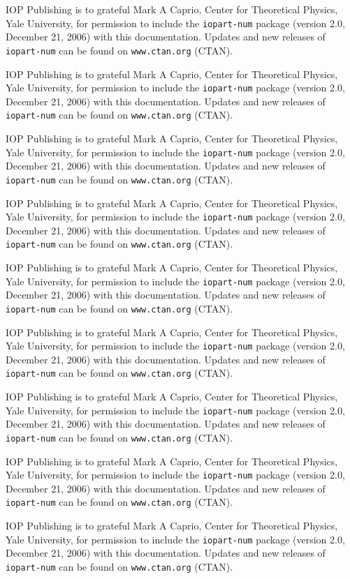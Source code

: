 \documentclass[a4paper]{jpconf}
\begin{document}
\begin{thebibliography}{9}
     IOP Publishing is to grateful Mark A Caprio, Center for Theoretical Physics, Yale University, for permission to include the {\tt iopart-num} \BibTeX package (version 2.0, December 21, 2006) with  this documentation. Updates and new releases of {\tt iopart-num} can be found on \verb"www.ctan.org" (CTAN).

     IOP Publishing is to grateful Mark A Caprio, Center for Theoretical Physics, Yale University, for permission to include the {\tt iopart-num} \BibTeX package (version 2.0, December 21, 2006) with  this documentation. Updates and new releases of {\tt iopart-num} can be found on \verb"www.ctan.org" (CTAN).

     IOP Publishing is to grateful Mark A Caprio, Center for Theoretical Physics, Yale University, for permission to include the {\tt iopart-num} \BibTeX package (version 2.0, December 21, 2006) with  this documentation. Updates and new releases of {\tt iopart-num} can be found on \verb"www.ctan.org" (CTAN).

     IOP Publishing is to grateful Mark A Caprio, Center for Theoretical Physics, Yale University, for permission to include the {\tt iopart-num} \BibTeX package (version 2.0, December 21, 2006) with  this documentation. Updates and new releases of {\tt iopart-num} can be found on \verb"www.ctan.org" (CTAN).

     IOP Publishing is to grateful Mark A Caprio, Center for Theoretical Physics, Yale University, for permission to include the {\tt iopart-num} \BibTeX package (version 2.0, December 21, 2006) with  this documentation. Updates and new releases of {\tt iopart-num} can be found on \verb"www.ctan.org" (CTAN).

     IOP Publishing is to grateful Mark A Caprio, Center for Theoretical Physics, Yale University, for permission to include the {\tt iopart-num} \BibTeX package (version 2.0, December 21, 2006) with  this documentation. Updates and new releases of {\tt iopart-num} can be found on \verb"www.ctan.org" (CTAN).

     IOP Publishing is to grateful Mark A Caprio, Center for Theoretical Physics, Yale University, for permission to include the {\tt iopart-num} \BibTeX package (version 2.0, December 21, 2006) with  this documentation. Updates and new releases of {\tt iopart-num} can be found on \verb"www.ctan.org" (CTAN).

     IOP Publishing is to grateful Mark A Caprio, Center for Theoretical Physics, Yale University, for permission to include the {\tt iopart-num} \BibTeX package (version 2.0, December 21, 2006) with  this documentation. Updates and new releases of {\tt iopart-num} can be found on \verb"www.ctan.org" (CTAN).

     IOP Publishing is to grateful Mark A Caprio, Center for Theoretical Physics, Yale University, for permission to include the {\tt iopart-num} \BibTeX package (version 2.0, December 21, 2006) with  this documentation. Updates and new releases of {\tt iopart-num} can be found on \verb"www.ctan.org" (CTAN).
\end{thebibliography}
\end{document}
